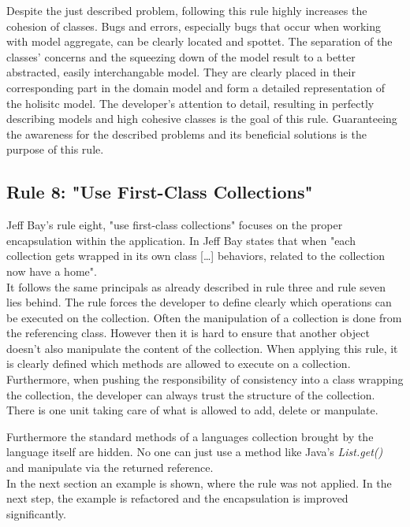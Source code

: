 Despite the just described problem, following this rule highly increases the cohesion of classes. Bugs and errors, especially bugs that occur when working with model aggregate, can be clearly located and spottet. The separation of the classes' concerns and the squeezing down of the model result to a better abstracted, easily interchangable model. They are clearly placed in their corresponding part in the domain model and form a detailed representation of the holisitc model. The developer's attention to detail, resulting in perfectly describing models and high cohesive classes is the goal of this rule. Guaranteeing the awareness for the described problems and its beneficial solutions is the purpose of this rule. 

\subsection*{Rule 8: "Use First-Class Collections"}
Jeff Bay's rule eight, "use first-class collections" focuses on the proper encapsulation within the application. In \cite{oc2008} Jeff Bay states that when "each collection gets wrapped in its own class [\dots{}] behaviors, related to the collection now have a home". 
\\

It follows the same principals as already described in rule three and rule seven lies behind. The rule forces the developer to define clearly which operations can be executed on the collection. Often the manipulation of a collection is done from the referencing class. However then it is hard to ensure that another object doesn't also manipulate the content of the collection. When applying this rule, it is clearly defined which methods are allowed to execute on a collection. Furthermore, when pushing the responsibility of consistency into a class wrapping the collection, the developer can always trust the structure of the collection. There is one unit taking care of what is allowed to add, delete or manpulate. 

Furthermore the standard methods of a languages collection brought by the language itself are hidden. No one can just use a method like Java's \textit{List.get()} and manipulate via the returned reference. 
\\

In the next section an example is shown, where the rule was not applied. In the next step, the example is refactored and the encapsulation is improved significantly. 
\\

